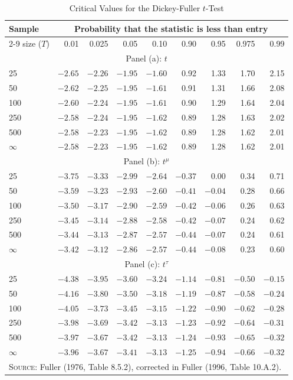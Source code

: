 \begin{table}[htbp]
\centering
\caption{Critical Values for the Dickey-Fuller $t$-Test}
\label{tab:9.2}
\small
\begin{tabular}{l*{8}{r}}
\toprule
Sample & \multicolumn{8}{c}{Probability that the statistic is less than entry} \\
\cmidrule(l){2-9}
size ($T$) & 0.01 & 0.025 & 0.05 & 0.10 & 0.90 & 0.95 & 0.975 & 0.99 \\
\midrule
\multicolumn{9}{c}{Panel (a): $t$} \\
\midrule
25   & $-2.65$ & $-2.26$ & $-1.95$ & $-1.60$ & 0.92 & 1.33 & 1.70 & 2.15 \\
50   & $-2.62$ & $-2.25$ & $-1.95$ & $-1.61$ & 0.91 & 1.31 & 1.66 & 2.08 \\
100  & $-2.60$ & $-2.24$ & $-1.95$ & $-1.61$ & 0.90 & 1.29 & 1.64 & 2.04 \\
250  & $-2.58$ & $-2.24$ & $-1.95$ & $-1.62$ & 0.89 & 1.28 & 1.63 & 2.02 \\
500  & $-2.58$ & $-2.23$ & $-1.95$ & $-1.62$ & 0.89 & 1.28 & 1.62 & 2.01 \\
$\infty$ & $-2.58$ & $-2.23$ & $-1.95$ & $-1.62$ & 0.89 & 1.28 & 1.62 & 2.01 \\
\midrule
\multicolumn{9}{c}{Panel (b): $t^\mu$} \\
\midrule
25   & $-3.75$ & $-3.33$ & $-2.99$ & $-2.64$ & $-0.37$ & 0.00 & 0.34 & 0.71 \\
50   & $-3.59$ & $-3.23$ & $-2.93$ & $-2.60$ & $-0.41$ & $-0.04$ & 0.28 & 0.66 \\
100  & $-3.50$ & $-3.17$ & $-2.90$ & $-2.59$ & $-0.42$ & $-0.06$ & 0.26 & 0.63 \\
250  & $-3.45$ & $-3.14$ & $-2.88$ & $-2.58$ & $-0.42$ & $-0.07$ & 0.24 & 0.62 \\
500  & $-3.44$ & $-3.13$ & $-2.87$ & $-2.57$ & $-0.44$ & $-0.07$ & 0.24 & 0.61 \\
$\infty$ & $-3.42$ & $-3.12$ & $-2.86$ & $-2.57$ & $-0.44$ & $-0.08$ & 0.23 & 0.60 \\
\midrule
\multicolumn{9}{c}{Panel (c): $t^\tau$} \\
\midrule
25   & $-4.38$ & $-3.95$ & $-3.60$ & $-3.24$ & $-1.14$ & $-0.81$ & $-0.50$ & $-0.15$ \\
50   & $-4.16$ & $-3.80$ & $-3.50$ & $-3.18$ & $-1.19$ & $-0.87$ & $-0.58$ & $-0.24$ \\
100  & $-4.05$ & $-3.73$ & $-3.45$ & $-3.15$ & $-1.22$ & $-0.90$ & $-0.62$ & $-0.28$ \\
250  & $-3.98$ & $-3.69$ & $-3.42$ & $-3.13$ & $-1.23$ & $-0.92$ & $-0.64$ & $-0.31$ \\
500  & $-3.97$ & $-3.67$ & $-3.42$ & $-3.13$ & $-1.24$ & $-0.93$ & $-0.65$ & $-0.32$ \\
$\infty$ & $-3.96$ & $-3.67$ & $-3.41$ & $-3.13$ & $-1.25$ & $-0.94$ & $-0.66$ & $-0.32$ \\
\bottomrule
\multicolumn{9}{l}{\footnotesize\textsc{Source}: Fuller (1976, Table 8.5.2), corrected in Fuller (1996, Table 10.A.2).}
\end{tabular}
\end{table}

